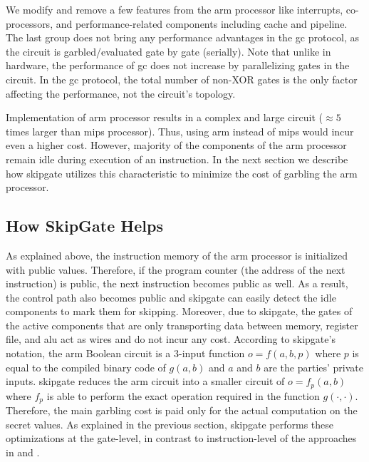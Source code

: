 We modify and remove a few features from the \gls{arm} processor like interrupts, co-processors, and performance-related components including cache and pipeline.
The last group does not bring any performance advantages in the \acrshort{gc} protocol, as the circuit is garbled/evaluated gate by gate (serially).
Note that unlike in hardware, the performance of \acrshort{gc} does not increase by parallelizing gates in the circuit.
In the \acrshort{gc} protocol, the total number of non-XOR gates is the only factor affecting the performance, not the circuit's topology.

Implementation of \gls{arm} processor results in a complex and large circuit ($\approx 5$ times larger than \gls{mips} processor).
Thus, using \gls{arm} instead of \gls{mips} would incur even a higher cost.
However, majority of the components of the \gls{arm} processor remain idle during  execution of an instruction.
In the next section we describe how \gls{skipgate} utilizes this characteristic to minimize the cost of garbling the \gls{arm} processor.

\subsection{How {SkipGate} Helps}
As explained above, the instruction memory of the \gls{arm} processor is initialized with public values.
Therefore, if the program counter (the address of the next instruction) is public, the next instruction becomes public as well.
As a result, the control path also becomes public and \gls{skipgate} can easily detect the idle components to mark them for skipping.
Moreover, due to \gls{skipgate}, the gates of the active components that are only transporting data between memory, register file, and \acrshort{alu} act as wires and do not incur any cost.
According to \gls{skipgate}'s notation, the \gls{arm} Boolean circuit is a 3-input function $o = f(a,b,p)$ where $p$ is equal to the compiled binary code of $g(a,b)$ and $a$ and $b$ are the parties' private inputs.
\gls{skipgate} reduces the \gls{arm} circuit into a smaller circuit of $o = f_p(a,b)$ where $f_p$ is able to perform the exact operation required in the function $g(\cdot,\cdot)$.
Therefore, the main garbling cost is paid only for the actual computation on the secret values.
As explained in the previous section, \gls{skipgate} performs these optimizations at the gate-level, in contrast to instruction-level of the approaches in  and \cite{wang2016secure}.

